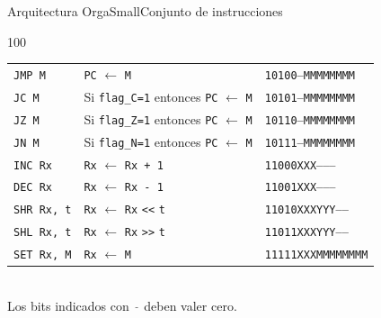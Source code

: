 \documentclass[aspectratio=169]{beamer}
\begin{document}
\begin{frame}[fragile,t]{Arquitectura OrgaSmall}{Conjunto de instrucciones}
\begin{textblock}{100}
\begin{tabular}{l|l|l}
    \texttt{JMP M}         & \texttt{PC} $\leftarrow$ \texttt{M}                                & \texttt{\textcolor{r}{10100}\textcolor{gray}{---}\textcolor{a}{MMMMMMMM}} \\  %
    \texttt{JC M}          & Si \texttt{flag\_C=1} entonces \texttt{PC} $\leftarrow$ \texttt{M} & \texttt{\textcolor{r}{10101}\textcolor{gray}{---}\textcolor{a}{MMMMMMMM}} \\  %
    \texttt{JZ M}          & Si \texttt{flag\_Z=1} entonces \texttt{PC} $\leftarrow$ \texttt{M} & \texttt{\textcolor{r}{10110}\textcolor{gray}{---}\textcolor{a}{MMMMMMMM}} \\  %
    \texttt{JN M}          & Si \texttt{flag\_N=1} entonces \texttt{PC} $\leftarrow$ \texttt{M} & \texttt{\textcolor{r}{10111}\textcolor{gray}{---}\textcolor{a}{MMMMMMMM}} \\  %
    \hline
    \texttt{INC Rx}        & \texttt{Rx} $\leftarrow$ \texttt{Rx + 1}                           & \texttt{\textcolor{r}{11000}\textcolor{v}{XXX}\textcolor{gray}{--------}} \\  %
    \texttt{DEC Rx}        & \texttt{Rx} $\leftarrow$ \texttt{Rx - 1}                           & \texttt{\textcolor{r}{11001}\textcolor{v}{XXX}\textcolor{gray}{--------}} \\  %
    \texttt{SHR Rx, t}     & \texttt{Rx} $\leftarrow$ \texttt{Rx} \verb|<<| \texttt{t}          & \texttt{\textcolor{r}{11010}\textcolor{v}{XXX}\textcolor{verde}{YYY}\textcolor{gray}{-----}} \\  %
    \texttt{SHL Rx, t}     & \texttt{Rx} $\leftarrow$ \texttt{Rx} \verb|>>| \texttt{t}          & \texttt{\textcolor{r}{11011}\textcolor{v}{XXX}\textcolor{verde}{YYY}\textcolor{gray}{-----}} \\  %
    \hline
    \texttt{SET Rx, M}     & \texttt{Rx} $\leftarrow$ \texttt{M}                                & \texttt{\textcolor{r}{11111}\textcolor{v}{XXX}\textcolor{a}{MMMMMMMM}} \\  %
    \end{tabular}\\
    \vspace{0.2cm}
    Los bits indicados con \textcolor{gray}{\texttt{-}} deben valer cero.
    \end{textblock}
\end{frame}
\end{document}
